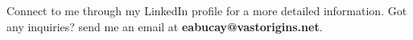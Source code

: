 
{Connect to me through my LinkedIn profile for a more detailed information. Got any inquiries? send me an email at \textbf{eabucay@vastorigins.net}.}